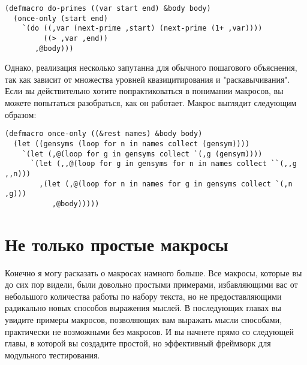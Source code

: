 \begin{lstlisting}
(defmacro do-primes ((var start end) &body body)
  (once-only (start end)
    `(do ((,var (next-prime ,start) (next-prime (1+ ,var))))
         ((> ,var ,end))
       ,@body)))
\end{lstlisting}

Однако, реализация  несколько запутанна для обычного пошагового
объяснения, так как зависит от множества уровней квазицитирования и "раскавычивания". Если
вы действительно хотите попрактиковаться в понимании макросов, вы можете попытаться
разобраться, как он работает. Макрос выглядит следующим образом:

\begin{lstlisting}
(defmacro once-only ((&rest names) &body body)
  (let ((gensyms (loop for n in names collect (gensym))))
    `(let (,@(loop for g in gensyms collect `(,g (gensym))))
      `(let (,,@(loop for g in gensyms for n in names collect ``(,,g ,,n)))
        ,(let (,@(loop for n in names for g in gensyms collect `(,n ,g)))
           ,@body)))))
\end{lstlisting}

\section{Не только простые макросы}

Конечно я могу расказать о макросах намного больше. Все макросы, которые вы до сих пор
видели, были довольно простыми примерами, избавляющими вас от небольшого количества работы
по набору текста, но не предоставляющими радикально новых способов выражения мыслей. В
последующих главах вы увидите примеры макросов, позволяющих вам выражать мысли способами,
практически не возможными без макросов. И вы начнете прямо со следующей главы, в которой
вы создадите простой, но эффективный фреймворк для модульного тестирования.

